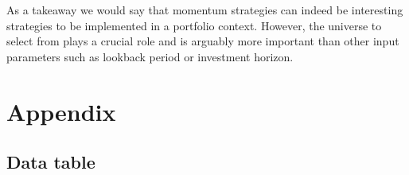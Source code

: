 \documentclass[a4paper,12pt,twoside]{article}
\begin{document}
    As a takeaway we would say that momentum strategies can indeed be interesting strategies to be implemented in a portfolio context. However, the universe to select from plays a crucial role and is arguably more important than other input parameters such as lookback period or investment horizon.\\


\newpage



\renewcommand{\thesection}{A}
\section{Appendix}
\subsection{Data table}
\end{document}
